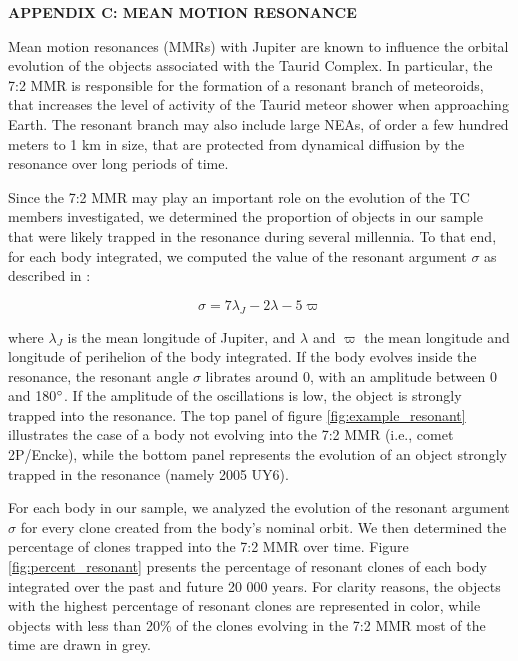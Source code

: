 \documentclass[a4paper,11pt]{article}
\begin{document}
\newpage
\textbf{APPENDIX C:  MEAN MOTION RESONANCE}\\ \label{appendix:resonant_asteroids}

Mean motion resonances (MMRs) with Jupiter are known to influence the orbital evolution of the objects associated with the Taurid Complex. In particular, the 7:2 MMR is responsible for the formation of a resonant branch of meteoroids, that increases the level of activity of the Taurid meteor shower when approaching Earth. The resonant branch may also include large NEAs, of order a few hundred meters to 1 km in size, that are protected from dynamical diffusion by the resonance over long periods of time. 

Since the 7:2 MMR may play an important role on the evolution of the TC members investigated, we determined the proportion of objects in our sample that were likely trapped in the resonance during several millennia. To that end, for each body integrated, we computed the value of the resonant argument $\sigma$ as described in \cite{Asher1991}:  

\begin{equation}
\sigma =  7\lambda_J - 2\lambda - 5\varpi
\end{equation}

where $\lambda_J$ is the mean longitude of Jupiter, and $\lambda$ and $\varpi$ the mean longitude and  longitude of perihelion of the body integrated. If the body evolves inside the resonance, the resonant angle $\sigma$ librates around 0, with an amplitude between 0 and 180$\degree$. If the amplitude of the oscillations is low, the object is strongly trapped into the resonance. The top panel of figure \ref{fig:example_resonant} illustrates the case of a body not evolving into the 7:2 MMR (i.e., comet 2P/Encke), while the bottom panel represents the evolution of an object strongly trapped in the resonance (namely 2005 UY6). 

For each body in our sample, we analyzed the evolution of the resonant argument $\sigma$ for every clone created from the body's nominal orbit. We then determined the percentage of clones trapped into the 7:2 MMR over time. Figure \ref{fig:percent_resonant} presents the percentage of resonant clones of each body integrated over the past and future 20 000 years. For clarity reasons, the objects with the highest percentage of resonant clones are represented in color, while objects with less than 20\% of the clones evolving in the 7:2 MMR most of the time are drawn in grey. 
\end{document}
